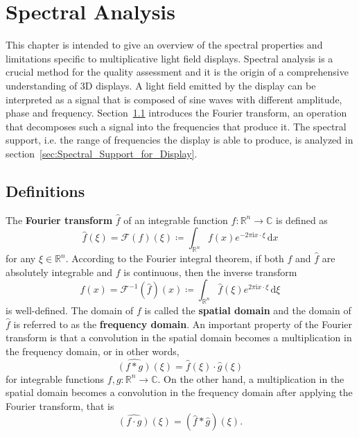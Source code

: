 \chapter{Spectral Analysis}
\label{chp:spectral_analysis}

This chapter is intended to give an overview of the spectral properties and limitations specific to multiplicative light field displays.
Spectral analysis is a crucial method for the quality assessment and it is the origin of a comprehensive understanding of 3D displays. 
A light field emitted by the display can be interpreted as a signal that is composed of sine waves with different amplitude, phase and frequency.
Section~\ref{sec:Definitions} introduces the Fourier transform, an operation that decomposes such a signal into the frequencies that produce it.
The spectral support, i.e. the range of frequencies the display is able to produce, is analyzed in section~\ref{sec:Spectral_Support_for_Display}. 

\section{Definitions}
\label{sec:Definitions}

The \textbf{Fourier transform} $\hat{f}$ of an integrable function $f \colon \mathbb{R}^n \to \mathbb{C}$ is defined as 
\begin{equation}
	\hat{f}(\xi) = \mathcal{F}(f)(\xi) \coloneqq \int_{\mathbb{R}^n} f(x) e^{-2 \pi \mathrm{i} x \cdot \xi} \, \mathrm{d}x
\end{equation}
for any $\xi \in \mathbb{R}^n$. 
According to the Fourier integral theorem, if both $f$ and $\hat{f}$ are absolutely integrable and $f$ is continuous, then the inverse transform 
\begin{equation}
	f(x) = \mathcal{F}^{-1}(\hat{f})(x) \coloneqq \int_{\mathbb{R}^n} \hat{f}(\xi) e^{2 \pi \mathrm{i} x \cdot \xi} \, \mathrm{d}\xi
\end{equation}
is well-defined.
The domain of $f$ is called the \textbf{spatial domain} and the domain of $\hat{f}$ is referred to as the \textbf{frequency domain}.
An important property of the Fourier transform is that a convolution in the spatial domain becomes a multiplication in the frequency domain, or in other words, 
\begin{equation}\label{eq:convolution_theorem_1}
	\widehat{(f \ast g)}(\xi) = \hat{f}(\xi) \cdot \hat{g}(\xi)
\end{equation}
for integrable functions $f, g \colon \mathbb{R}^n \to \mathbb{C}$.
On the other hand, a multiplication in the spatial domain becomes a convolution in the frequency domain after applying the Fourier transform, that is
\begin{equation}\label{eq:convolution_theorem_2}
	\widehat{(f \cdot g)}(\xi) = (\hat{f} \ast \hat{g})(\xi).
\end{equation}


